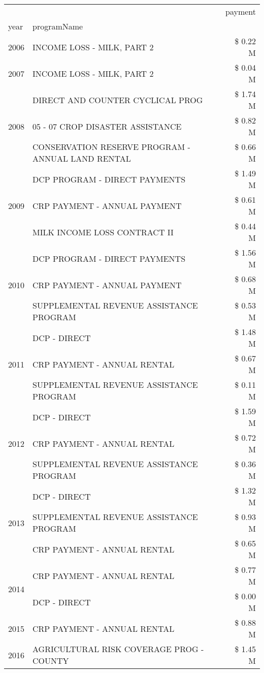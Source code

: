 \begin{tabular}{llr}
\toprule
 &  & payment \\
year & programName &  \\
\midrule
2006 & INCOME LOSS - MILK, PART 2 & \$ 0.22 M \\
\cline{1-3}
2007 & INCOME LOSS - MILK, PART 2 & \$ 0.04 M \\
\cline{1-3}
\multirow[t]{3}{*}{2008} & DIRECT AND COUNTER CYCLICAL PROG & \$ 1.74 M \\
 & 05 - 07 CROP DISASTER ASSISTANCE & \$ 0.82 M \\
 & CONSERVATION RESERVE PROGRAM - ANNUAL LAND RENTAL & \$ 0.66 M \\
\cline{1-3}
\multirow[t]{3}{*}{2009} & DCP PROGRAM - DIRECT PAYMENTS & \$ 1.49 M \\
 & CRP PAYMENT - ANNUAL PAYMENT & \$ 0.61 M \\
 & MILK INCOME LOSS CONTRACT II & \$ 0.44 M \\
\cline{1-3}
\multirow[t]{3}{*}{2010} & DCP PROGRAM - DIRECT PAYMENTS & \$ 1.56 M \\
 & CRP PAYMENT - ANNUAL PAYMENT & \$ 0.68 M \\
 & SUPPLEMENTAL REVENUE ASSISTANCE PROGRAM & \$ 0.53 M \\
\cline{1-3}
\multirow[t]{3}{*}{2011} & DCP - DIRECT & \$ 1.48 M \\
 & CRP PAYMENT - ANNUAL RENTAL & \$ 0.67 M \\
 & SUPPLEMENTAL REVENUE ASSISTANCE PROGRAM & \$ 0.11 M \\
\cline{1-3}
\multirow[t]{3}{*}{2012} & DCP - DIRECT & \$ 1.59 M \\
 & CRP PAYMENT - ANNUAL RENTAL & \$ 0.72 M \\
 & SUPPLEMENTAL REVENUE ASSISTANCE PROGRAM & \$ 0.36 M \\
\cline{1-3}
\multirow[t]{3}{*}{2013} & DCP - DIRECT & \$ 1.32 M \\
 & SUPPLEMENTAL REVENUE ASSISTANCE PROGRAM & \$ 0.93 M \\
 & CRP PAYMENT - ANNUAL RENTAL & \$ 0.65 M \\
\cline{1-3}
\multirow[t]{2}{*}{2014} & CRP PAYMENT - ANNUAL RENTAL & \$ 0.77 M \\
 & DCP - DIRECT & \$ 0.00 M \\
\cline{1-3}
2015 & CRP PAYMENT - ANNUAL RENTAL & \$ 0.88 M \\
\cline{1-3}
\multirow[t]{3}{*}{2016} & AGRICULTURAL RISK COVERAGE PROG - COUNTY & \$ 1.45 M \\

\end{tabular}
